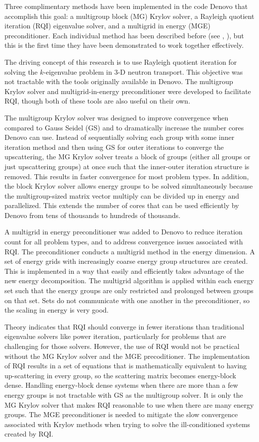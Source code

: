\documentclass[preprint,12pt]{elsarticle}
\begin{document}
Three complimentary methods have been implemented in the code Denovo \cite{Evans2010} that accomplish this goal: a multigroup block (MG) Krylov solver, a Rayleigh quotient iteration (RQI) eigenvalue solver, and a multigrid in energy (MGE) preconditioner. Each individual method has been described before (see \cite{Slaybaugh2012}, \cite{Slaybaugh2013}), but this is the first time they have been demonstrated to work together effectively.

The driving concept of this research is to use Rayleigh quotient iteration for solving the $k$-eigenvalue problem in 3-D neutron transport. This objective was not tractable with the tools originally available in Denovo. The multigroup Krylov solver and multigrid-in-energy preconditioner were developed to facilitate RQI, though both of these tools are also useful on their own. 

The multigroup Krylov solver was designed to improve convergence when compared to Gauss Seidel (GS) and to dramatically increase the number cores Denovo can use. Instead of sequentially solving each group with some inner iteration method and then using GS for outer iterations to converge the upscattering, the MG Krylov solver treats a block of groups (either all groups or just upscattering groups) at once such that the inner-outer iteration structure is removed. This results in faster convergence for most problem types. In addition, the block Krylov solver allows energy groups to be solved simultaneously because the multigroup-sized matrix vector multiply can be divided up in energy and parallelized. This extends the number of cores that can be used efficiently by Denovo from tens of thousands to hundreds of thousands. 

A multigrid in energy preconditioner was added to Denovo to reduce iteration count for all problem types, and to address convergence issues associated with RQI. The  preconditioner conducts a multigrid method in the energy dimension. A set of energy grids with increasingly coarse energy group structures are created. This is implemented in a way that easily and efficiently takes advantage of the new energy decomposition. The multigrid algorithm is applied within each energy set such that the energy groups are only restricted and prolonged between groups on that set. Sets do not communicate with one another in the preconditioner, so the scaling in energy is very good. 

Theory indicates that RQI should converge in fewer iterations than traditional eigenvalue solvers like power iteration, particularly for problems that are challenging for those solvers. However, the use of RQI would not be practical without the MG Krylov solver and the MGE precoditioner. The implementation of RQI results in a set of equations that is mathematically equivalent to having up-scattering in every group, so the scattering matrix becomes energy-block dense. Handling energy-block dense systems when there are more than a few energy groups is not tractable with GS as the multigroup solver. It is only the MG Krylov solver that makes RQI reasonable to use when there are many energy groups. The MGE preconditioner is needed to mitigate the slow convergence associated with Krylov methods when trying to solve the ill-conditioned systems created by RQI. 
\end{document}
